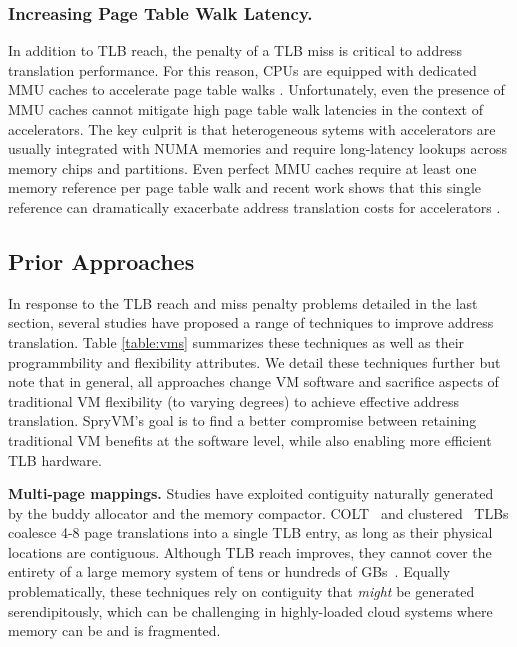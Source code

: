 \subsubsection{Increasing Page Table Walk Latency.} 
In addition to TLB reach, the penalty of a TLB miss is critical to
address translation performance. For this reason, CPUs are equipped
with dedicated MMU caches to accelerate page table walks
\cite{bhattacharjee:large-reach, barr:translation}. Unfortunately,
even the presence of MMU caches cannot mitigate high page table walk
latencies in the context of accelerators. The key culprit is that
heterogeneous sytems with accelerators are usually integrated with
NUMA memories and require long-latency lookups across memory chips and
partitions. Even perfect MMU caches require at least one memory
reference per page table walk and recent work shows that this single
reference can dramatically exacerbate address translation costs for
accelerators \cite{picorel:near-memory}.


\subsection{Prior Approaches}

In response to the TLB reach and miss penalty problems detailed in the
last section, several studies have proposed a range of techniques to
improve address translation. Table \ref{table:vms} summarizes these
techniques as well as their programmbility and flexibility
attributes. We detail these techniques further but note that in
general, all approaches change VM software and sacrifice aspects of
traditional VM flexibility (to varying degrees) to achieve effective
address translation. SpryVM's goal is to find a better compromise
between retaining traditional VM benefits at the software level, while
also enabling more efficient TLB hardware.

\vspace{2mm}
\noindent\textbf{Multi-page mappings.} Studies have exploited
contiguity naturally generated by the buddy allocator and the memory
compactor. COLT~\cite{pham:colt} and clustered~\cite{pham:increasing}
TLBs coalesce 4-8 page translations into a single TLB entry, as long
as their physical locations are contiguous. Although TLB reach
improves, they cannot cover the entirety of a large memory system of
tens or hundreds of GBs~\cite{gandhi:range}.  Equally problematically,
these techniques rely on contiguity that {\it might} be generated
serendipitously, which can be challenging in highly-loaded cloud
systems where memory can be and is fragmented.

